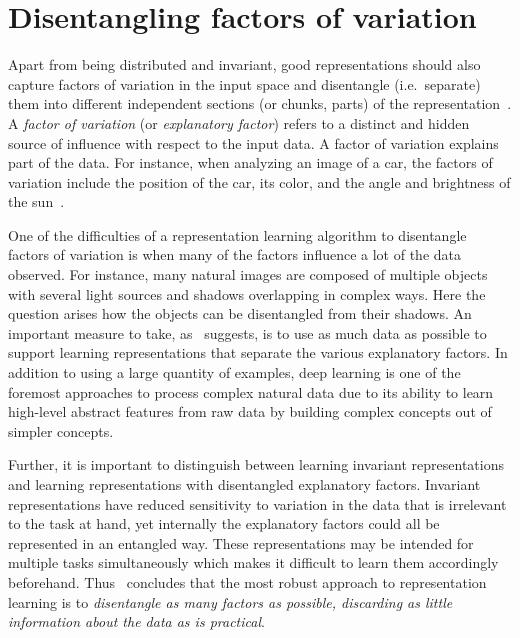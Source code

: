 \documentclass[a4paper,12pt]{report}
\begin{document}
\section{Disentangling factors of variation}\label{subsec:unsupDFoV}
Apart from being distributed and invariant, good representations should also capture factors of variation in the input space and disentangle (i.e.\ separate) them into different independent sections (or chunks, parts) of the representation~\cite{ReprLearning}. A \textit{factor of variation} (or \textit{explanatory factor}) refers to a distinct and hidden source of influence with respect to the input data. A factor of variation explains part of the data. For instance, when analyzing an image of a car, the factors of variation include the position of the car, its color, and the angle and brightness of the sun~\cite{DeepLearningBook}.

One of the difficulties of a representation learning algorithm to disentangle factors of variation is when many of the factors influence a lot of the data observed. For instance, many natural images are composed of multiple objects with several light sources and shadows overlapping in complex ways. Here the question arises how the objects can be disentangled from their shadows. An important measure to take, as~\cite{ReprLearning} suggests, is to use as much data as possible to support learning representations that separate the various explanatory factors. In addition to using a large quantity of examples, deep learning is one of the foremost approaches to process complex natural data due to its ability to learn high-level abstract features from raw data by building complex concepts out of simpler concepts. 

Further, it is important to distinguish between learning invariant representations and learning representations with disentangled explanatory factors. Invariant representations have reduced sensitivity to variation in the data that is irrelevant to the task at hand, yet internally the explanatory factors could all be represented in an entangled way. These representations may be intended for multiple tasks simultaneously which makes it difficult to learn them accordingly beforehand. Thus~\cite{ReprLearning} concludes that the most robust approach to representation learning is to \textit{disentangle as many factors as possible, discarding as little information about the data as is practical}.
\end{document}
